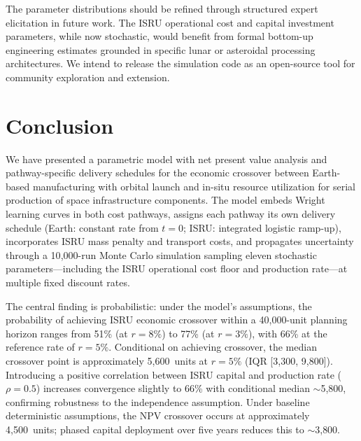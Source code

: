 \documentclass[preprint,12pt]{elsarticle}
\begin{document}
The parameter distributions should be refined through structured expert elicitation in future work. The ISRU operational cost and capital investment parameters, while now stochastic, would benefit from formal bottom-up engineering estimates grounded in specific lunar or asteroidal processing architectures. We intend to release the simulation code as an open-source tool for community exploration and extension.

\section{Conclusion}
\label{sec:conclusion}

We have presented a parametric model with net present value analysis and pathway-specific delivery schedules for the economic crossover between Earth-based manufacturing with orbital launch and in-situ resource utilization for serial production of space infrastructure components. The model embeds Wright learning curves in both cost pathways, assigns each pathway its own delivery schedule (Earth: constant rate from $t = 0$; ISRU: integrated logistic ramp-up), incorporates ISRU mass penalty and transport costs, and propagates uncertainty through a 10{,}000-run Monte Carlo simulation sampling eleven stochastic parameters---including the ISRU operational cost floor and production rate---at multiple fixed discount rates.

The central finding is probabilistic: under the model's assumptions, the probability of achieving ISRU economic crossover within a 40{,}000-unit planning horizon ranges from 51\% (at $r = 8\%$) to 77\% (at $r = 3\%$), with 66\% at the reference rate of $r = 5\%$. Conditional on achieving crossover, the median crossover point is approximately 5{,}600~units at $r = 5\%$ (IQR [3{,}300, 9{,}800]). Introducing a positive correlation between ISRU capital and production rate ($\rho = 0.5$) increases convergence slightly to 66\% with conditional median $\sim$5{,}800, confirming robustness to the independence assumption. Under baseline deterministic assumptions, the NPV crossover occurs at approximately 4{,}500~units; phased capital deployment over five years reduces this to $\sim$3{,}800.
\end{document}
